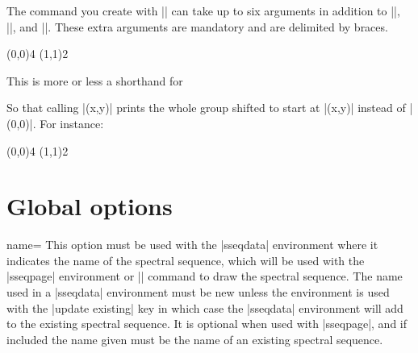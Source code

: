 \documentclass{ltxdoc}
\begin{document}
\begin{sseqdata}[name=ex1,degree={#1}{1-#1}]
\begin{command}{\sseqnewcmd{}}
The command you create with |\sseqnewcmd| can take up to six arguments in addition to |\options|, |\x|, and |\y|. These extra arguments are mandatory and are delimited by braces.
\begin{codeexample}[]
\sseqnewcmd*{}
\begin{sseqpage}
\tower[orange](0,0){4}
\tower[red](1,1){2}
\end{sseqpage}
\end{codeexample}
\end{command}

\begin{command}{\sseqnewgroup{}}
This is more or less a shorthand for
\begin{codeexample}[code only, code=white]
\sseqnewcmd\opt{*}\cscolor{(\obscurexname,\obscureyname)}
\end{codeexample}
So that calling |\mygroup(x,y)| prints the whole group shifted to start at |(x,y)| instead of |(0,0)|. For instance:
\begin{codeexample}[]
\sseqnewgroup*{}
\begin{sseqpage}
\tower[orange](0,0){4}
\tower[red](1,1){2}
\end{sseqpage}
\end{codeexample}
\end{command}

\section{Global options}
\begin{key}{name=}
This option must be used with the |sseqdata| environment where it indicates the name of the spectral sequence, which will be used with the |sseqpage| environment or |\printpage| command to draw the spectral sequence. The name used in a |sseqdata| environment must be new unless the environment is used with the |update existing| key in which case the |sseqdata| environment will add to the existing spectral sequence. It is optional when used with |sseqpage|, and if included the name given must be the name of an existing spectral sequence.
\end{key}


\end{sseqdata}
\end{document}
